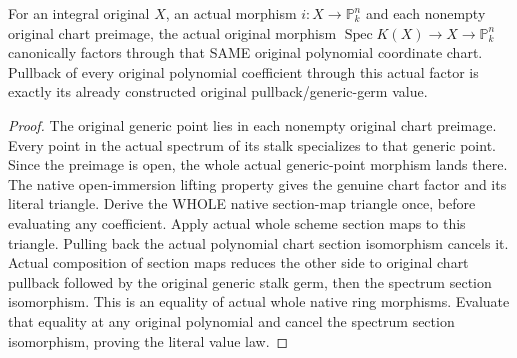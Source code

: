 \begin{theorem}
\label{thm:seven-original-projective-generic-factors-route}
\leanok
{}
For an integral original $X$, an actual morphism $i:X\to\mathbb P^n_k$
and each nonempty original chart preimage, the actual original morphism
$\operatorname{Spec}K(X)\to X\to\mathbb P^n_k$ canonically factors
through that SAME original polynomial coordinate chart. Pullback of
every original polynomial coefficient through this actual factor is
exactly its already constructed original pullback/generic-germ value.
\end{theorem}
\begin{proof}
The original generic point lies in each nonempty original chart
preimage. Every point in the actual spectrum of its stalk specializes
to that generic point. Since the preimage is open, the whole actual
generic-point morphism lands there. The native open-immersion lifting
property gives the genuine chart factor and its literal triangle.
Derive the WHOLE native section-map triangle once, before evaluating any coefficient. Apply actual whole scheme section maps to this triangle. Pulling back
the actual polynomial chart section isomorphism cancels it. Actual
composition of section maps reduces the other side to original chart
pullback followed by the original generic stalk germ, then the spectrum
section isomorphism. This is an equality of actual whole native ring morphisms. Evaluate that equality at any original polynomial and cancel the spectrum section isomorphism, proving the literal value law.
\end{proof}

